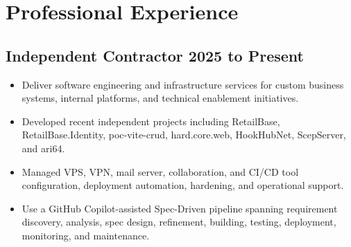 \section*{Professional Experience}

\subsection*{Independent Contractor \hfill 2025 to Present}
\begin{itemize}[leftmargin=12pt]
    \item Deliver software engineering and infrastructure services for custom business systems, internal platforms, and technical enablement initiatives.
    \item Developed recent independent projects including RetailBase, RetailBase.Identity, poc-vite-crud, hard.core.web, HookHubNet, ScepServer, and ari64.
    \item Managed VPS, VPN, mail server, collaboration, and CI/CD tool configuration, deployment automation, hardening, and operational support.
    \item Use a GitHub Copilot-assisted Spec-Driven pipeline spanning requirement discovery, analysis, spec design, refinement, building, testing, deployment, monitoring, and maintenance.
\end{itemize}

